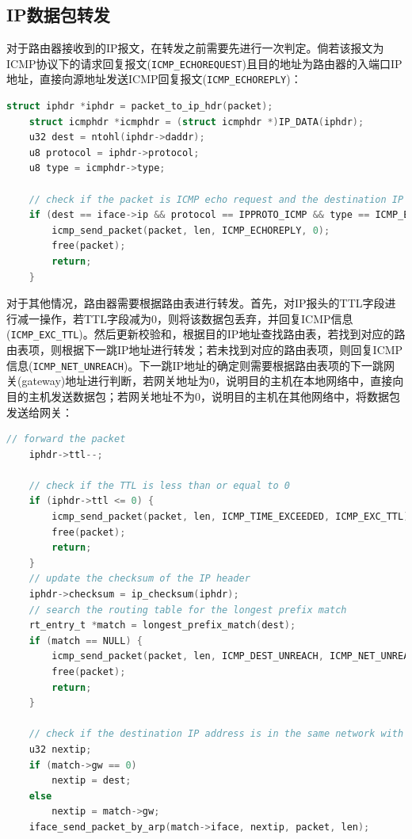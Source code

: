 \documentclass[UTF8]{report}
\begin{document}
\subsection{IP数据包转发}

对于路由器接收到的IP报文，在转发之前需要先进行一次判定。倘若该报文为ICMP协议下的请求回复报文(\texttt{ICMP_ECHOREQUEST})且目的地址为路由器的入端口IP地址，直接向源地址发送ICMP回复报文(\texttt{ICMP_ECHOREPLY})：

\begin{lstlisting}[language=C]
	struct iphdr *iphdr = packet_to_ip_hdr(packet);
	struct icmphdr *icmphdr = (struct icmphdr *)IP_DATA(iphdr);
	u32 dest = ntohl(iphdr->daddr);
	u8 protocol = iphdr->protocol;
	u8 type = icmphdr->type;

	// check if the packet is ICMP echo request and the destination IP address is equal to the IP address of the iface
	if (dest == iface->ip && protocol == IPPROTO_ICMP && type == ICMP_ECHOREQUEST) {
		icmp_send_packet(packet, len, ICMP_ECHOREPLY, 0);
		free(packet);
		return;
	}
\end{lstlisting}

对于其他情况，路由器需要根据路由表进行转发。首先，对IP报头的TTL字段进行减一操作，若TTL字段减为0，则将该数据包丢弃，并回复ICMP信息(\texttt{ICMP_EXC_TTL})。然后更新校验和，根据目的IP地址查找路由表，若找到对应的路由表项，则根据下一跳IP地址进行转发；若未找到对应的路由表项，则回复ICMP信息(\texttt{ICMP_NET_UNREACH})。下一跳IP地址的确定则需要根据路由表项的下一跳网关(gateway)地址进行判断，若网关地址为0，说明目的主机在本地网络中，直接向目的主机发送数据包；若网关地址不为0，说明目的主机在其他网络中，将数据包发送给网关：

\begin{lstlisting}[language=C]
	// forward the packet
	iphdr->ttl--;

	// check if the TTL is less than or equal to 0
	if (iphdr->ttl <= 0) {
		icmp_send_packet(packet, len, ICMP_TIME_EXCEEDED, ICMP_EXC_TTL);
		free(packet);
		return;
	}
	// update the checksum of the IP header
	iphdr->checksum = ip_checksum(iphdr);
	// search the routing table for the longest prefix match
	rt_entry_t *match = longest_prefix_match(dest);
	if (match == NULL) {
		icmp_send_packet(packet, len, ICMP_DEST_UNREACH, ICMP_NET_UNREACH);
		free(packet);
		return;
	}

	// check if the destination IP address is in the same network with the iface
	u32 nextip;
	if (match->gw == 0)
		nextip = dest;
	else
		nextip = match->gw;
	iface_send_packet_by_arp(match->iface, nextip, packet, len);
\end{lstlisting}
\end{document}
